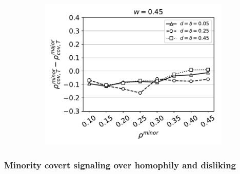 \documentclass[11pt,letterpaper]{article}
\begin{document}
\begin{figure}[H]
\begin{subfigure}{0.31\textwidth}
    \includegraphics[width=\textwidth]{Figures/minority-homophily=0p45.pdf}
    \caption{}
  \end{subfigure}
  \caption{}
\end{figure}


\subsubsection{Minority covert signaling over homophily and disliking}
\end{document}

